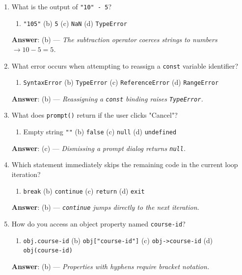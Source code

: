 \begin{enumerate}[leftmargin=1.5em]
    \item What is the output of \texttt{"10" - 5}?
    \begin{enumerate}[label=(\alph*)]
        \item \texttt{"105"} \quad (b) \texttt{5} \quad (c) \texttt{NaN} \quad (d) \texttt{TypeError}
    \end{enumerate}
    \textbf{Answer}: (b) --- \textit{The subtraction operator coerces strings to numbers $\to 10 - 5 = 5$.}

    \item What error occurs when attempting to reassign a \texttt{const} variable identifier?
    \begin{enumerate}[label=(\alph*)]
        \item \texttt{SyntaxError} \quad (b) \texttt{TypeError} \quad (c) \texttt{ReferenceError} \quad (d) \texttt{RangeError}
    \end{enumerate}
    \textbf{Answer}: (b) --- \textit{Reassigning a \texttt{const} binding raises \texttt{TypeError}.}

    \item What does \texttt{prompt()} return if the user clicks "Cancel"?
    \begin{enumerate}[label=(\alph*)]
        \item Empty string \texttt{""} \quad (b) \texttt{false} \quad (c) \texttt{null} \quad (d) \texttt{undefined}
    \end{enumerate}
    \textbf{Answer}: (c) --- \textit{Dismissing a prompt dialog returns \texttt{null}.}

    \item Which statement immediately skips the remaining code in the current loop iteration?
    \begin{enumerate}[label=(\alph*)]
        \item \texttt{break} \quad (b) \texttt{continue} \quad (c) \texttt{return} \quad (d) \texttt{exit}
    \end{enumerate}
    \textbf{Answer}: (b) --- \textit{\texttt{continue} jumps directly to the next iteration.}

    \item How do you access an object property named \texttt{course-id}?
    \begin{enumerate}[label=(\alph*)]
        \item \texttt{obj.course-id} \quad (b) \texttt{obj["course-id"]} \quad (c) \texttt{obj->course-id} \quad (d) \texttt{obj(course-id)}
    \end{enumerate}
    \textbf{Answer}: (b) --- \textit{Properties with hyphens require bracket notation.}
\end{enumerate}

